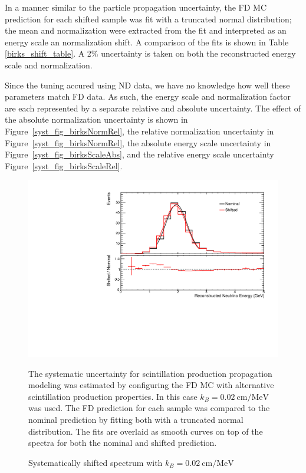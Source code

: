 {In a manner similar to the particle propagation uncertainty,
the FD MC prediction for each shifted sample was fit
with a truncated normal distribution;
the mean and normalization
were extracted from the fit and interpreted as an energy
scale an normalization shift.
A comparison of the fits is shown in Table \ref{birks_shift_table}.
A 2\% uncertainty is taken on both the reconstructed energy scale
and normalization.

Since the tuning accured using ND data, we have no knowledge how well
these parameters match FD data.
As such, the energy scale and normalization factor are each
represented by a separate relative and absolute uncertainty.
The effect of the absolute normalization uncertainty is shown in
Figure~\ref{syst_fig_birksNormRel},
the relative normalization uncertainty in Figure~\ref{syst_fig_birksNormRel},
the absolute energy scale uncertainty in Figure~\ref{syst_fig_birksScaleAbs},
and the relative energy scale uncertainty Figure~\ref{syst_fig_birksScaleRel}.

\begin{figure}
\begin{center}
\includegraphics[width=\textwidth]{figures/systs/params/fd_birksb.pdf}
\end{center}
\caption{Systematically shifted spectrum with $k_B = 0.02~\text{cm} / \text{MeV}$}{
The systematic uncertainty for scintillation production propagation modeling
was estimated by configuring the FD MC with alternative
scintillation production properties.
In this case $k_B = 0.02~\text{cm} / \text{MeV}$ was used.
The FD prediction for each sample was compared to the nominal prediction
by fitting both with a truncated normal distribution.
The fits are overlaid as smooth curves on top of the spectra for both
the nominal and shifted prediction.
}
\label{syst_param_fd_birksb}


\end{figure}}
